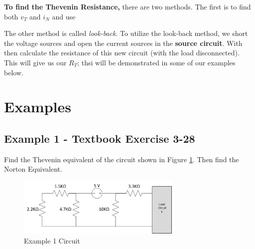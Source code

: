 \documentclass{handout}
\begin{document}
\textbf{To find the Thevenin Resistance,} there are two methods.  The first is to find both $v_T$ and $i_N$ and use

The other method is called {\em look-back}. To utilize the look-back method, we short the voltage sources and open the current sources in the \textbf{source circuit}.  With then calculate the resistance of this new circuit (with the load disconnected).  This will give us our $R_T$; thsi will be demonstrated in some of our examples below.

\newpage
\clearpage
\pagebreak

\section{Examples}

\subsection{Example 1 - Textbook Exercise 3-28}
Find the Thevenin equivalent of the circuit shown in Figure \ref{fig: Example1}.  Then find the Norton Equivalent.
\begin{figure} [h t b]
\centering
\includegraphics[width=0.7\textwidth]{Example1.jpg}
\caption{Example 1 Circuit}
\label{fig: Example1}
\end{figure}
\end{document}
